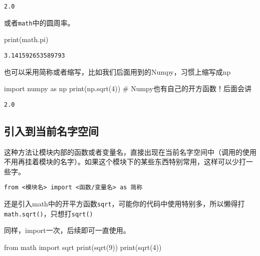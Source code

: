 \documentclass[
  letterpaper,
  DIV=11,
  numbers=noendperiod]{scrreprt}
\newenvironment{Shaded}{\begin{snugshade}}{\end{snugshade}}
\newcommand{\BuiltInTok}[1]{\textcolor[rgb]{0.00,0.23,0.31}{#1}}
\newcommand{\CommentTok}[1]{\textcolor[rgb]{0.37,0.37,0.37}{#1}}
\newcommand{\DecValTok}[1]{\textcolor[rgb]{0.68,0.00,0.00}{#1}}
\newcommand{\ImportTok}[1]{\textcolor[rgb]{0.00,0.46,0.62}{#1}}
\newcommand{\NormalTok}[1]{\textcolor[rgb]{0.00,0.23,0.31}{#1}}
\begin{document}
\begin{verbatim}
2.0
\end{verbatim}

或者\texttt{math}中的圆周率。

\begin{Shaded}
\begin{Highlighting}[]
\BuiltInTok{print}\NormalTok{(math.pi)}
\end{Highlighting}
\end{Shaded}

\begin{verbatim}
3.141592653589793
\end{verbatim}

也可以采用简称或者缩写，比如我们后面用到的Numpy，习惯上缩写成np

\begin{Shaded}
\begin{Highlighting}[]
\ImportTok{import}\NormalTok{ numpy }\ImportTok{as}\NormalTok{ np }
\BuiltInTok{print}\NormalTok{(np.sqrt(}\DecValTok{4}\NormalTok{)) }\CommentTok{\# Numpy也有自己的开方函数！后面会讲}
\end{Highlighting}
\end{Shaded}

\begin{verbatim}
2.0
\end{verbatim}

\hypertarget{ux5f15ux5165ux5230ux5f53ux524dux540dux5b57ux7a7aux95f4}{%
\subsection{引入到当前名字空间}\label{ux5f15ux5165ux5230ux5f53ux524dux540dux5b57ux7a7aux95f4}}

这种方法让模块内部的函数或者变量名，直接出现在当前名字空间中（调用的使用不用再挂着模块的名字）。如果这个模块下的某些东西特别常用，这样可以少打一些字。

\begin{verbatim}
from <模块名> import <函数/变量名> as 简称
\end{verbatim}

还是引入math中的开平方函数\texttt{sqrt}，可能你的代码中使用特别多，所以懒得打\texttt{math.sqrt()}，只想打\texttt{sqrt()}

同样，import一次，后续即可一直使用。

\begin{Shaded}
\begin{Highlighting}[]
\ImportTok{from}\NormalTok{ math }\ImportTok{import}\NormalTok{ sqrt}
\BuiltInTok{print}\NormalTok{(sqrt(}\DecValTok{9}\NormalTok{))}
\BuiltInTok{print}\NormalTok{(sqrt(}\DecValTok{4}\NormalTok{))}
\end{Highlighting}
\end{Shaded}
\end{document}
